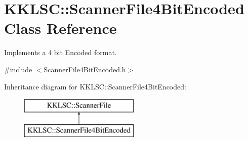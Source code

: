 \hypertarget{class_k_k_l_s_c_1_1_scanner_file4_bit_encoded}{}\section{K\+K\+L\+SC\+:\+:Scanner\+File4\+Bit\+Encoded Class Reference}
\label{class_k_k_l_s_c_1_1_scanner_file4_bit_encoded}


Implements a 4 bit Encoded format.  




{\ttfamily \#include $<$Scanner\+File4\+Bit\+Encoded.\+h$>$}

Inheritance diagram for K\+K\+L\+SC\+:\+:Scanner\+File4\+Bit\+Encoded\+:\begin{figure}[H]
\begin{center}
\leavevmode
\includegraphics[height=2.000000cm]{class_k_k_l_s_c_1_1_scanner_file4_bit_encoded}
\end{center}
\end{figure}
